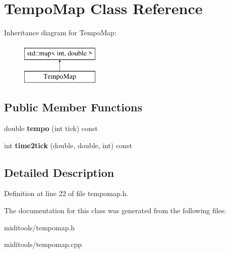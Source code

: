 \hypertarget{class_tempo_map}{}\section{Tempo\+Map Class Reference}
\label{class_tempo_map}
Inheritance diagram for Tempo\+Map\+:\begin{figure}[H]
\begin{center}
\leavevmode
\includegraphics[height=2.000000cm]{class_tempo_map}
\end{center}
\end{figure}
\subsection*{Public Member Functions}
\begin{DoxyCompactItemize}
\item 
\mbox{\label{class_tempo_map_a5bc76e623ee45d01daebb6c433970f05}} 
double {\bfseries tempo} (int tick) const
\item 
\mbox{\label{class_tempo_map_a537e4fc1804482cfe98f01ae00b7c1ab}} 
int {\bfseries time2tick} (double, double, int) const
\end{DoxyCompactItemize}


\subsection{Detailed Description}


Definition at line 22 of file tempomap.\+h.



The documentation for this class was generated from the following files\+:\begin{DoxyCompactItemize}
\item 
miditools/tempomap.\+h\item 
miditools/tempomap.\+cpp\end{DoxyCompactItemize}
